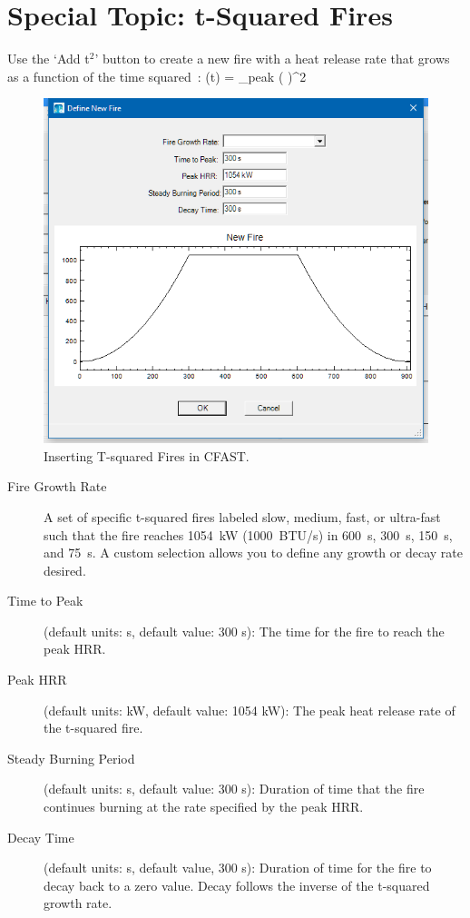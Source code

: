 \section{Special Topic: t-Squared Fires}
\label{tsq}
Use the `Add t$^2$' button to create a new fire with a heat release rate that grows as a function of the time squared~\cite{Schifiliti:2002}:
\be
   \dQ(t) = \dQ_{\rm peak} \; \left(  \right)^2
\ee

\begin{figure}[h!]
\begin{center}
\includegraphics[width=5in]{FIGURES/Create_t2}
\caption[Inserting T-squared Fires in CFAST]{Inserting T-squared Fires in CFAST.}
\end{center}
\end{figure}

\begin{description}
\item[Fire Growth Rate] A set of specific t-squared fires labeled slow, medium, fast, or ultra-fast such that the fire reaches 1054~kW (1000~BTU/s) in 600~s, 300~s, 150~s, and 75~s.  A custom selection allows you to define any growth or decay rate desired.
\item[Time to Peak] (default units: s, default value: 300 s): The time for the fire to reach the peak HRR.
\item[Peak HRR] (default units: kW, default value: 1054 kW): The peak heat release rate of the t-squared fire.
\item[Steady Burning Period] (default units: s, default value: 300 s): Duration of time that the fire continues burning at the rate specified by the peak HRR.
\item[Decay Time] (default units: s, default value, 300 s): Duration of time for the fire to decay back to a zero value.  Decay follows the inverse of the t-squared growth rate.
\end{description}








